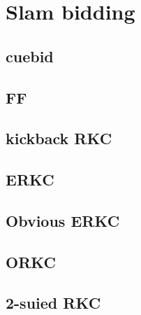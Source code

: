 \section{Slam bidding}

\subsection{cuebid}


\subsection{FF}


\subsection{kickback RKC}


\subsection{ERKC}


\subsection{Obvious ERKC}


\subsection{ORKC}


\subsection{2-suied RKC}

